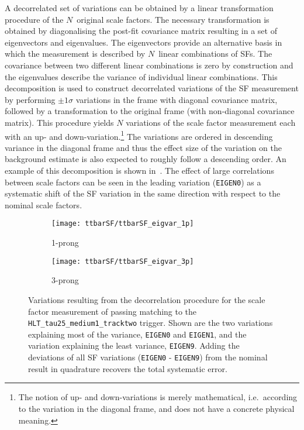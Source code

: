 A decorrelated set of variations can be obtained by a linear
transformation procedure of the $N$~original scale factors. The
necessary transformation is obtained by diagonalising the post-fit
covariance matrix resulting in a set of eigenvectors and
eigenvalues. The eigenvectors provide an alternative basis in which
the measurement is described by $N$~linear combinations of SFs. The
covariance between two different linear combinations is zero by
construction and the eigenvalues describe the variance of individual
linear combinations. This decomposition is used to construct
decorrelated variations of the SF measurement by performing
$\pm 1 \sigma$ variations in the frame with diagonal covariance
matrix, followed by a transformation to the original frame (with
non-diagonal covariance matrix). This procedure yields $N$ variations
of the scale factor measurement each with an up- and
down-variation.\footnote{The notion of up- and down-variations is
  merely mathematical, i.e.\ according to the variation in the
  diagonal frame, and does not have a concrete physical meaning.} The
variations are ordered in descending variance in the diagonal frame
and thus the effect size of the variation on the background estimate
is also expected to roughly follow a descending order. An example of this
decomposition is shown in~. The
effect of large correlations between scale factors can be seen in the
leading variation (\texttt{EIGEN0}) as a systematic shift of the SF
variation in the same direction with respect to the nominal scale
factors.

\begin{figure}[htbp]
  \centering

  \begin{subfigure}[t]{.495\textwidth}
    \texttt{[image: ttbarSF/ttbarSF\_eigvar\_1p]}
    \caption{1-prong \tauhadvis}
    \label{fig:ttbarSF_eigenvariations_1p}
  \end{subfigure}\hfill%
  \begin{subfigure}[t]{.495\textwidth}
    \texttt{[image: ttbarSF/ttbarSF\_eigvar\_3p]}
    \caption{3-prong \tauhadvis}
    \label{fig:ttbarSF_eigenvariations_3p}
  \end{subfigure}

  \caption{Variations resulting from the decorrelation procedure for
    the scale factor measurement of \tauhadvis passing matching to the
    \texttt{HLT\_tau25\_medium1\_tracktwo} trigger. Shown are the two
    variations explaining most of the variance, \texttt{EIGEN0} and
    \texttt{EIGEN1}, and the variation explaining the least variance,
    \texttt{EIGEN9}. Adding the deviations of all SF variations
    (\texttt{EIGEN0} - \texttt{EIGEN9}) from the nominal result in
    quadrature recovers the total systematic error.}
  \label{fig:ttbarSF_eigenvariations}
\end{figure}


